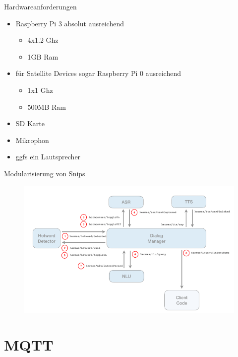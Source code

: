 \documentclass[aspectratio=169]{beamer}
\begin{document}
\begin{frame}{Hardwareanforderungen}
	\begin{itemize}
		\item Raspberry Pi 3 absolut ausreichend
		\begin{itemize}
			\item 4x1.2 Ghz
			\item 1GB Ram
		\end{itemize}
	    \item für Satellite Devices sogar Raspberry Pi 0 ausreichend
	    \begin{itemize}
	    	\item 1x1 Ghz
	    	\item 500MB Ram
	    \end{itemize}
        \item SD Karte
        \item Mikrophon
        \item ggfs ein Lautsprecher
	\end{itemize}
\end{frame}

\begin{frame}{Modularisierung von Snips}
	\begin{figure}
		\includegraphics[scale=0.4]{images/mqtt-snips}
	\end{figure}
\end{frame}

\section{MQTT}
\end{document}
